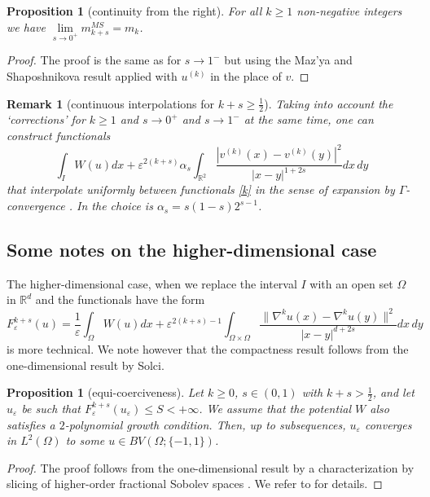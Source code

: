 \documentclass{article}
\newtheorem{proposition}[lemma]{Proposition}
\newtheorem{remark}[lemma]{Remark}
\newcommand{\e}{\varepsilon}
\begin{document}
\begin{proposition}[continuity from the right] For all $k\ge 1$ non-negative integers we have $\lim\limits_{s\to 0^+}m^{MS}_{k+s}=m_k$.
\end{proposition}

\begin{proof} The proof is the same as for $s\to 1^-$ but using the Maz'ya and Shaposhnikova result applied with $u^{(k)}$ in the place of $v$.
\end{proof}

\begin{remark}[continuous interpolations for $k+s\ge \frac12$]\rm
Taking into account the `corrections' for $k\ge 1$ and $s\to 0^+$ and $s\to 1^-$ at the same time, one can construct functionals
$$
\int_I W(u)dx+ \e^{2(k+s)}\alpha_s\int_{\mathbb R^2}\frac{|v^{(k)}(x)-v^{(k)}(y)|^2}{|x-y|^{1+2s}} dx\,dy 
$$
that interpolate uniformly between functionals \eqref{k} in the sense of expansion by $\Gamma$-convergence \cite{BT}.  In \cite{Solci} the choice is $\alpha_s=s(1-s)2^{s-1}$. 
\end{remark}

\subsection{Some notes on the higher-dimensional case}
The higher-dimensional case, when we replace the interval $I$ with an open set $\Omega$ in $\mathbb R^d$ and the functionals have the form 
 \begin{equation}\label{k+s-hd}
F^{k+s}_\e(u)=\frac1\e\int_\Omega W(u)dx+ \e^{2(k+s)-1} \int_{\Omega\times \Omega}\frac{\|\nabla^ku(x)-\nabla^ku(y)\|^2}{|x-y|^{d+2s}}dx\,dy
\end{equation}
is more technical. We note however that the compactness result follows from the one-dimensional result by Solci.

\begin{proposition}[equi-coerciveness]
Let $k\ge 0$, $s\in (0,1)$ with $k+s>\frac12$, and let $u_\e$ be such that $F^{k+s}_\e(u_\e)\le S<+\infty$.
We assume that the potential $W$ also satisfies a $2$-polynomial growth condition.
Then, up to subsequences, $u_\e$ converges in $L^2(\Omega)$ to some $u\in BV(\Omega;\{-1,1\})$.
\end{proposition}

\begin{proof}
The proof follows from the one-dimensional result by a characterization by slicing of higher-order fractional Sobolev spaces \cite{leofrac}. We refer to \cite{BOP} for details. 
\end{proof}
\end{document}
